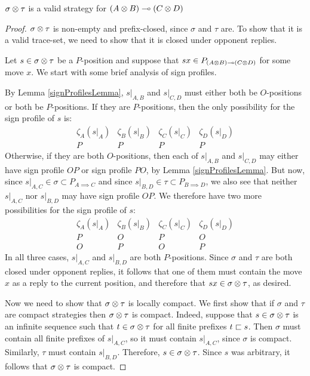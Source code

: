 \documentclass{article}
\begin{document}
\begin{proposition}
  $\sigma\otimes\tau$ is a valid strategy for $(A\otimes B)\multimap (C\otimes D)$
  \begin{proof}
    $\sigma\otimes\tau$ is non-empty and prefix-closed, since $\sigma$ and $\tau$ are.  To show that it is a valid trace-set, we need to show that it is closed under opponent replies.

    Let $s\in\sigma\otimes\tau$ be a $P$-position and suppose that $sx\in P_{(A\otimes B)\multimap (C\otimes D)}$ for some move $x$.  We start with some brief analysis of sign profiles.  

    By Lemma \ref{signProfilesLemma}, $s\vert_{A,B}$ and $s\vert_{C,D}$ must either both be $O$-positions or both be $P$-positions.  If they are $P$-positions, then the only possibility for the sign profile of $s$ is:
    \[
      \begin{array}{cccc}
        \zeta_A(s\vert_A) & \zeta_B(s\vert_B) & \zeta_C(s\vert_C) & \zeta_D(s\vert_D) \\
        \hline
        P & P & P & P
      \end{array}
      \]
    Otherwise, if they are both $O$-positions, then each of $s\vert_{A,B}$ and $s\vert_{C,D}$ may either have sign profile $OP$ or sign profile $PO$, by Lemma \ref{signProfilesLemma}.  But now, since $s\vert_{A,C}\in\sigma\subset P_{A\implies C}$ and since $s\vert_{B,D}\in\tau\subset P_{B\implies D}$, we also see that neither $s\vert_{A,C}$ nor $s\vert_{B,D}$ may have sign profile $OP$.  We therefore have two more possibilities for the sign profile of $s$:
    \[
      \begin{array}{cccc}
        \zeta_A(s\vert_A) & \zeta_B(s\vert_B) & \zeta_C(s\vert_C) & \zeta_D(s\vert_D) \\
        \hline
        P & O & P & O \\
        O & P & O & P
      \end{array}
      \]
    In all three cases, $s\vert_{A,C}$ and $s\vert_{B,D}$ are both $P$-positions.  Since $\sigma$ and $\tau$ are both closed under opponent replies, it follows that one of them must contain the move $x$ as a reply to the current position, and therefore that $sx\in\sigma\otimes\tau$, as desired.

    Now we need to show that $\sigma\otimes\tau$ is locally compact.  We first show that if $\sigma$ and $\tau$ are compact strategies then $\sigma\otimes\tau$ is compact.  Indeed, suppose that $s\in\sigma\otimes\tau$ is an infinite sequence such that $t\in\sigma\otimes\tau$ for all finite prefixes $t\sqsubset s$.  Then $\sigma$ must contain all finite prefixes of $s\vert_{A,C}$, so it must contain $s\vert_{A,C}$, since $\sigma$ is compact.  Similarly, $\tau$ must contain $s\vert_{B,D}$.  Therefore, $s\in\sigma\otimes\tau$.  Since $s$ was arbitrary, it follows that $\sigma\otimes\tau$ is compact.  


\end{proof}
\end{proposition}
\end{document}
